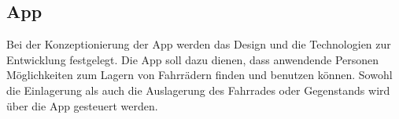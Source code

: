 \subsection{App}
Bei der Konzeptionierung der App werden das Design und die Technologien zur Entwicklung festgelegt.
\noindent Die App soll dazu dienen, dass anwendende Personen Möglichkeiten zum Lagern von Fahrrädern finden und benutzen können. Sowohl die Einlagerung als auch die Auslagerung des Fahrrades oder Gegenstands wird über die App gesteuert werden.



\clearpage

